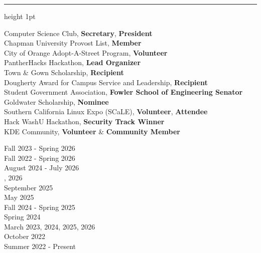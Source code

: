 \documentclass[letter]{article}
\begin{document}
    \medskip
    \vspace{4pt}
    \hrule height 1pt
    \vspace{4pt}
    \noindent
    \begin{minipage}[c]{0.7\linewidth}
        \noindent Computer Science Club, \textbf{Secretary}, \textbf{President} \\
        \noindent Chapman University Provost List, \textbf{Member} \\
        \noindent City of Orange Adopt-A-Street Program, \textbf{Volunteer} \\
        \noindent PantherHacks Hackathon, \textbf{Lead Organizer} \\
        \noindent Town \& Gown Scholarship, \textbf{Recipient} \\
        \noindent Dougherty Award for Campus Service and Leadership, \textbf{Recipient} \\
        \noindent Student Government Association, \textbf{Fowler School of Engineering Senator} \\
        \noindent Goldwater Scholarship, \textbf{Nominee} \\
        \noindent Southern California Linux Expo (SCaLE), \textbf{Volunteer}, \textbf{Attendee} \\
        \noindent Hack WashU Hackathon, \textbf{Security Track Winner} \\
        \noindent KDE Community, \textbf{Volunteer} \& \textbf{Community Member} \\
    \end{minipage}
    \begin{minipage}[c]{0.295\linewidth}
        \vspace*{-\baselineskip}
        \begin{flushright}
            \noindent Fall 2023 - Spring 2026 \\
            \noindent Fall 2022 - Spring 2026 \\
            \noindent August 2024 - July 2026 \\
            , 2026 \\
            \noindent September 2025 \\
            \noindent May 2025 \\
            \noindent Fall 2024 - Spring 2025 \\
            \noindent Spring 2024 \\
            \noindent March 2023, 2024, 2025, 2026 \\
            \noindent October 2022 \\
            \noindent Summer 2022 - Present \\
        \end{flushright}
    \end{minipage}
\end{document}

